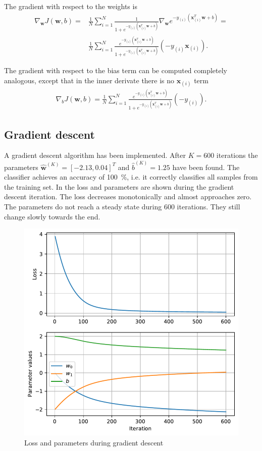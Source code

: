 \documentclass[12pt,a4paper]{scrartcl}
\newcommand{\matr}[1]{\mathbf{#1}}
\begin{document}
	The gradient with respect to the weights is
	\begin{align}
		\nabla_\matr{w} 	J(\matr{w}, b) =&  \frac{1}{N} \sum_{i=1}^{N} \frac{1}{1+e^{-y_{(i)}\left( \matr{x}_{(i)}^T \matr{w} + b\right) }} \nabla_\matr{w} e^{-y_{(i)}\left( \matr{x}_{(i)}^T \matr{w} + b\right) } = \\
		&\frac{1}{N} \sum_{i=1}^{N} \frac{e^{-y_{(i)}\left( \matr{x}_{(i)}^T \matr{w} + b\right) }}{1+e^{-y_{(i)}\left( \matr{x}_{(i)}^T \matr{w} + b\right) }} \left(-y_{(i)} \matr{x}_{(i)}\right).
	\end{align}

	The gradient with respect to the bias term can be computed completely analogous, except that in the inner derivate there is no $\matr{x}_{(i)}$ term
		\begin{align}
		\nabla_b 	J(\matr{w}, b) =\frac{1}{N} \sum_{i=1}^{N} \frac{e^{-y_{(i)}\left( \matr{x}_{(i)}^T \matr{w} + b\right) }}{1+e^{-y_{(i)}\left( \matr{x}_{(i)}^T \matr{w} + b\right) }} \left(-y_{(i)}\right).
	\end{align}

	\subsection*{Gradient descent}
	
	A gradient descent algorithm has been implemented. After $K=600$ iterations the parameters $\hat{\matr{w}}^{\left(K\right)} = [-2.13, 0.04]^T$ and $\hat{b}^{\left(K\right)}=1.25$ have been found.
	The classifier achieves an accuracy of \SI{100}{\percent}, i.e. it correctly classifies all samples from the training set.
	In  the loss and parameters are shown during the gradient descent iteration. The loss decreases monotonically and almost approaches zero.
	The parameters do not reach a steady state during $600$ iterations. They still change slowly towards the end.
	
	\begin{figure}[H]
		\centering	\includegraphics[width=0.85\linewidth]{figs/ex2_1_grad_desc.pdf}
		\caption{Loss and parameters during gradient descent}
		\label{fig:ex2_1_grad_desc}
	\end{figure}
	
\end{document}
